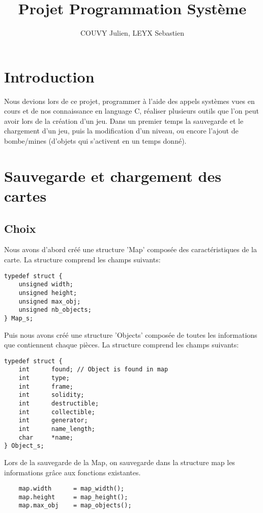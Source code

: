 \documentclass[a4paper]{article}
\title{Projet Programmation Système}
\author{COUVY Julien, LEYX Sebastien}
\begin{document}
\maketitle

\section{Introduction}
Nous devions lors de ce projet, programmer à l'aide des appels systèmes vues en cours et de nos connaissance en language C, réaliser plusieurs outils que l'on peut avoir lors de la création d'un jeu. Dans un premier temps la sauvegarde et le chargement d'un jeu, puis la modification d'un niveau, ou encore l'ajout de bombe/mines (d'objets qui s'activent en un temps donné). 

\section{Sauvegarde et chargement des cartes}
\subsection{Choix}
Nous avons d'abord créé une structure 'Map' composée des caractéristiques de la carte. La structure comprend les champs suivants:

\begin{verbatim}
typedef struct {
    unsigned width;
    unsigned height;
    unsigned max_obj;
    unsigned nb_objects;
} Map_s;
\end{verbatim}

Puis nous avons créé une structure 'Objects' composée de toutes les informations que contiennent chaque pièces. La structure comprend les champs suivants:
\begin{verbatim}
typedef struct {
    int      found; // Object is found in map
    int      type;
    int      frame;
    int      solidity;
    int      destructible;
    int      collectible;
    int      generator;
    int      name_length;
    char     *name;
} Object_s;
\end{verbatim}

Lors de la sauvegarde de la Map, on sauvegarde dans la structure map les informations grâce aux fonctions existantes.

\begin{verbatim}
    map.width      = map_width();
    map.height     = map_height();
    map.max_obj    = map_objects();
\end{verbatim}   
\end{document}
